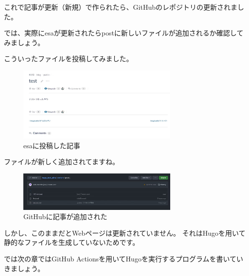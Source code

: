   これで記事が更新（新規）で作られたら、GitHubのレポジトリの更新されました。

  では、実際にesaが更新されたらpostに新しいファイルが追加されるか確認してみましょう。

  こういったファイルを投稿してみました。

  \begin{figure}[H]
    \centering
    \includegraphics[width=8cm]{./image/02-chap7/esa-posted.png}
    \caption{esaに投稿した記事 }
    \label{chap7-esa-posted-image}
  \end{figure}

  ファイルが新しく追加されてますね。

  \begin{figure}[H]
    \centering
    \includegraphics[width=8cm]{./image/02-chap7/github-upload-image.png}
    \caption{GitHubに記事が追加された }
    \label{chap7-github-upload-image-image}
  \end{figure}

  しかし、このままだとWebページは更新されていません。
  それはHugoを用いて静的なファイルを生成していないためです。

  では次の章ではGitHub Actionsを用いてHugoを実行するプログラムを書いていきましょう。




  
  
  